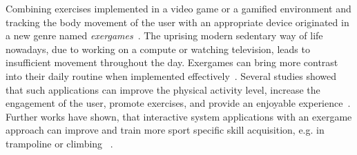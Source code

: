 Combining exercises implemented in a video game or a gamified environment and tracking the body movement of the user with an appropriate device originated in a new genre named \textit{exergames}~\cite{Buddharaju2016-ex, Sinclair2007-ex}.
The uprising modern sedentary way of life nowadays, due to working on a compute or watching television, leads to insufficient movement throughout the day.
Exergames can bring more contrast into their daily routine when implemented effectively~\cite{Rudella2012-ex}.
Several studies showed that such applications can improve the physical activity level, increase the engagement of the user, promote exercises, and provide an enjoyable experience~\cite{Graf2009-ex, Hicks2010-ex, Thin2010-ex}.
Further works have shown, that interactive system applications with an exergame approach can improve and train more sport specific skill acquisition, e.g. in trampoline or climbing ~\cite{Bogdanovych2015-ci, Medeiros2017-ex, Holsti2013-kn, Jensen2014-ex, Kajastila2016-ot}.

